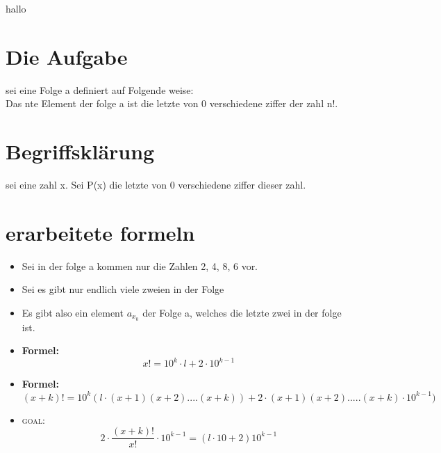 \documentclass[12pt, letterpaper]{article}
\begin{document}
\Beweis
\begin{theorem}
hallo  
\end{theorem}
\newpage
\section{Die Aufgabe}
\label{sec:Die Aufgabe}
sei eine Folge a definiert auf Folgende weise: \\
Das nte Element der folge a ist die letzte von 0 verschiedene ziffer der zahl n!.



\section{Begriffsklärung}
sei eine zahl x. Sei P(x) die letzte von 0 verschiedene ziffer dieser zahl.\\


\section{erarbeitete formeln}
\label{sec:erarbeitete formeln}
\begin{itemize}
	\item Sei in der folge a kommen nur die Zahlen 2, 4, 8, 6 vor.
	\item Sei es gibt nur endlich viele zweien in der Folge
	\item Es gibt also ein element $a_{x_{0}}$ der Folge a, welches die letzte zwei in der folge ist.\\
	\item \textbf{Formel:}	\[	
		x! = 10^{k} \cdot  l + 2\cdot  10^{k-1}
	\]
	\item \textbf{Formel:}	\[	
		(x+k)! = 10^{k}(l\cdot (x+1)(x+2)....(x+k))+2\cdot (x+1)(x+2).....(x+k)\cdot 10^{k-1})
	\]
	\item \textsc{goal:}	\[	
			2\cdot \frac{(x+k)!}{x!}\cdot  10^{k-1} = (l\cdot 10 +2	)10^{k-1}
	\]

\end{itemize}
\end{document}
